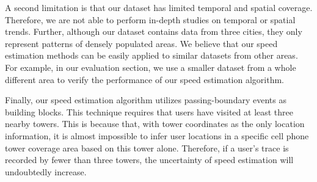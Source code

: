 
A second limitation is that our dataset has limited temporal and spatial coverage. Therefore, we are not able to perform in-depth studies on temporal or spatial trends. Further, although our dataset contains data from three cities, they only represent patterns of densely populated areas. We believe that our speed estimation methods can be easily applied to similar datasets from other areas. For example, in our evaluation section, we use a smaller dataset from a whole different area to verify the performance of our speed estimation algorithm.


Finally, our speed estimation algorithm utilizes passing-boundary events as building blocks. This technique requires that users have visited at least three nearby towers. This is because that, with tower coordinates as the only location information, it is almost impossible to infer user locations in a specific cell phone tower coverage area based on this tower alone. Therefore, if a user's trace is recorded by fewer than three towers, the uncertainty of speed estimation will undoubtedly increase.
